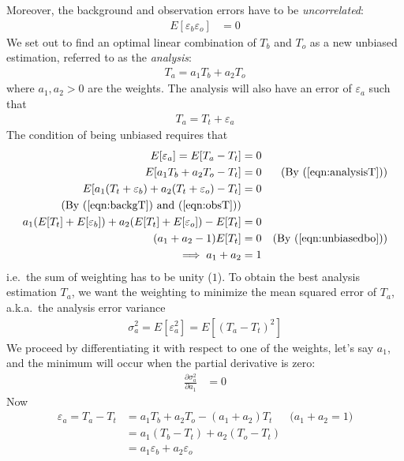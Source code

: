 Moreover, the background and observation errors have to be \textit{uncorrelated}:
\begin{align}
E[\varepsilon_b\varepsilon_o] &= 0 \label{eqn:bouncorr}
\end{align}
We set out to find an optimal linear combination of $T_b$ and $T_o$ as a new unbiased estimation, referred to as the \textit{analysis}:
\begin{align}
T_a = a_1T_b + a_2T_o \label{eqn:analysisT}
\end{align}
where $a_1, a_2 > 0$ are the weights. The analysis will also have an error of $\varepsilon_a$ such that 
\begin{align}
T_a = T_t + \varepsilon_a
\end{align}
The condition of being unbiased requires that
\begin{align}
E[\varepsilon_a] = E[T_a - T_t] &= 0 \nonumber \\
E[a_1T_b + a_2T_o - T_t] &= 0 \nonumber &\text{(By (\ref{eqn:analysisT}))}\\
E[a_1(T_t + \varepsilon_b) + a_2(T_t + \varepsilon_o) - T_t] &= 0 \nonumber\\
\text{(By (\ref{eqn:backgT}) and (\ref{eqn:obsT}))} &\nonumber \\
a_1(E[T_t] + E[\varepsilon_b]) + a_2(E[T_t] + E[\varepsilon_o]) - E[T_t] &= 0 \nonumber \\
(a_1 + a_2 - 1)E[T_t] &= 0 &\text{(By (\ref{eqn:unbiasedbo}))} \nonumber \\
\implies a_1 + a_2 &= 1
\end{align}
i.e.\ the sum of weighting has to be unity ($1$). To obtain the best analysis estimation $T_a$, we want the weighting to minimize the mean squared error of $T_a$, a.k.a.\ the analysis error variance 
\begin{align}
\sigma_a^2 = E[\varepsilon_a^2] = E[(T_a - T_t)^2]
\end{align}
We proceed by differentiating it with respect to one of the weights, let's say $a_1$, and the minimum will occur when the partial derivative is zero:
\begin{align}
\frac{\partial \sigma_a^2}{\partial a_1} &= 0 \label{eqn:DAunimin}
\end{align}
Now
\begin{align}
\varepsilon_a = T_a - T_t &= a_1T_b + a_2T_o - (a_1 + a_2)T_t & \text{($a_1 + a_2 = 1$)}\nonumber \\
&= a_1(T_b-T_t) + a_2(T_o-T_t) \nonumber \\
&= a_1\varepsilon_b + a_2\varepsilon_o
\end{align}
